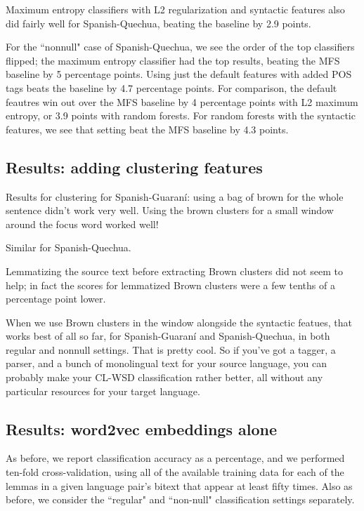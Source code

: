 Maximum entropy classifiers with L2 regularization and syntactic features also
did fairly well for Spanish-Quechua, beating the baseline by 2.9 points.

For the ``nonnull" case of Spanish-Quechua, we see the order of the top
classifiers flipped; the maximum entropy classifier had the top results,
beating the MFS baseline by 5 percentage points. Using just the default
features with added POS tags beats the baseline by 4.7 percentage points. For
comparison, the default feautres win out over the MFS baseline by 4 percentage
points with L2 maximum entropy, or 3.9 points with random forests. For random
forests with the syntactic features, we see that setting beat the MFS baseline
by 4.3 points.


\subsection{Results: adding clustering features}
Results for clustering for Spanish-Guaraní:
using a bag of brown for the whole sentence didn't work very well.
Using the brown clusters for a small window around the focus word worked well!

Similar for Spanish-Quechua.

Lemmatizing the source text before extracting
Brown clusters did not seem to help; in fact the scores for lemmatized Brown
clusters were a few tenths of a percentage point lower.  

When we use Brown clusters in the window alongside the syntactic featues, that
works best of all so far, for Spanish-Guaraní and Spanish-Quechua, in both
regular and nonnull settings. That is pretty cool. So if you've got a tagger,
a parser, and a bunch of monolingual text for your source language, you can
probably make your CL-WSD classification rather better, all without any
particular resources for your target language.

\subsection{Results: word2vec embeddings alone}
As before, we report classification accuracy
as a percentage, and we performed ten-fold cross-validation, using all of the
available training data for each of the lemmas in a given language pair's
bitext that appear at least fifty times. Also as before, we consider the
``regular" and ``non-null" classification settings separately.


